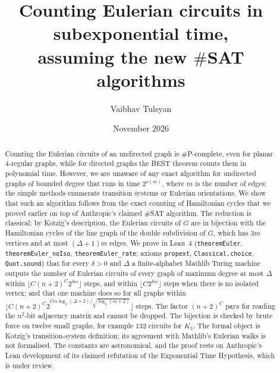 \documentclass[10pt]{amsart}
\theoremstyle{plain}
\theoremstyle{definition}
\theoremstyle{remark}
\numberwithin{equation}{section}
\begin{document}
\title[Counting Eulerian circuits in subexponential time]{Counting Eulerian circuits in subexponential time,\\ assuming the new $\#$SAT algorithms}

\author{Vaibhav Tulsyan}

\date{November 2026}


\begin{abstract}
Counting the Eulerian circuits of an undirected graph is $\#$P-complete, even for planar $4$-regular
graphs, while for directed graphs the BEST theorem counts them in polynomial time. However, we are
unaware of any exact algorithm for undirected graphs of bounded degree that runs in time $2^{o(m)}$,
where $m$ is the number of edges; the simple methods enumerate transition systems or Eulerian
orientations. We show that such an algorithm follows from the exact counting of Hamiltonian cycles
that we proved earlier on top of Anthropic's claimed $\#$SAT algorithm. The reduction is classical:
by Kotzig's description, the Eulerian circuits of $G$ are in bijection with the Hamiltonian cycles of
the line graph of the double subdivision of $G$, which has $3m$ vertices and at most $(\Delta+1)m$
edges. We prove in Lean~4 (\texttt{theoremEuler}, \texttt{theoremEuler\_noIso},
\texttt{theoremEuler\_rate}; axioms \texttt{propext}, \texttt{Classical.choice}, \texttt{Quot.sound})
that for every $\delta>0$ and $\Delta$ a finite-alphabet Mathlib Turing machine outputs the number of
Eulerian circuits of every graph of maximum degree at most $\Delta$ within
$\lfloor C(n+2)^C2^{\delta m}\rfloor$ steps, and within $\lfloor C2^{\delta m}\rfloor$ steps when there is
no isolated vertex; and that one machine does so for all graphs within
$\lfloor C(n+2)^C2^{Cm\log_2(\Delta+2)/\sqrt{\log_2(m+2)}}\rfloor$ steps. The factor $(n+2)^C$ pays for
reading the $n^2$-bit adjacency matrix and cannot be dropped. The bijection is checked by brute force
on twelve small graphs, for example $132$ circuits for $K_5$. The formal object is Kotzig's
transition-system definition; its agreement with Mathlib's Eulerian walks is not formalised. The
constants are astronomical, and the proof rests on Anthropic's Lean development of its claimed
refutation of the Exponential Time Hypothesis, which is under review.
\end{abstract}
\end{document}

